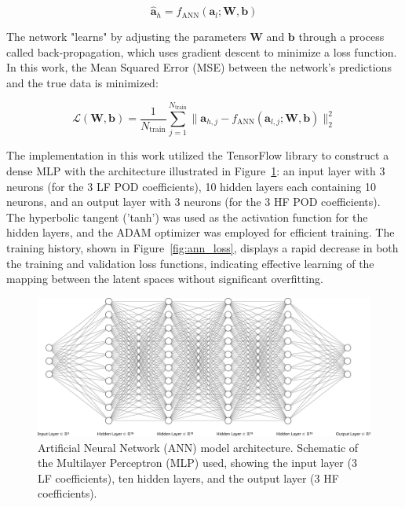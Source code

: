 \documentclass[tg, EN]{ufabcFHZh_tg}
\begin{document}
\begin{equation}
    \hat{\mathbf{a}}_h = f_{\text{ANN}}(\mathbf{a}_l; \mathbf{W}, \mathbf{b})
\end{equation}

The network "learns" by adjusting the parameters $\mathbf{W}$ and $\mathbf{b}$ through a process called back-propagation, which uses gradient descent to minimize a loss function. In this work, the Mean Squared Error (MSE) between the network's predictions and the true data is minimized:

\begin{equation}
    \mathcal{L}(\mathbf{W}, \mathbf{b}) = \frac{1}{N_{\text{train}}} \sum_{j=1}^{N_{\text{train}}} \| \mathbf{a}_{h,j} - f_{\text{ANN}}(\mathbf{a}_{l,j}; \mathbf{W}, \mathbf{b}) \|_2^2
\end{equation}

The implementation in this work utilized the TensorFlow library to construct a dense MLP with the architecture illustrated in Figure~\ref{fig:ann_architecture}: an input layer with 3 neurons (for the 3 LF POD coefficients), 10 hidden layers each containing 10 neurons, and an output layer with 3 neurons (for the 3 HF POD coefficients). The hyperbolic tangent ('tanh') was used as the activation function for the hidden layers, and the ADAM optimizer was employed for efficient training. The training history, shown in Figure~\ref{fig:ann_loss}, displays a rapid decrease in both the training and validation loss functions, indicating effective learning of the mapping between the latent spaces without significant overfitting.

\begin{figure}[H]
    \centering
    \includegraphics[width=\textwidth]{Figuras/nn.pdf}
    \caption{Artificial Neural Network (ANN) model architecture. Schematic of the Multilayer Perceptron (MLP) used, showing the input layer (3 LF coefficients), ten hidden layers, and the output layer (3 HF coefficients).}
    \label{fig:ann_architecture}
\end{figure}
\end{document}
